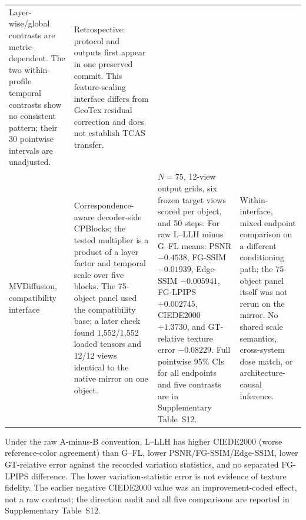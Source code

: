 \documentclass[times,twocolumn,final]{elsarticle}
\providecommand{\DIFadd}[1]{{\protect\color{blue} \sf #1}} %
\providecommand{\DIFaddbegin}{} %
\providecommand{\DIFaddend}{} %
\providecommand{\DIFaddFL}[1]{\DIFadd{#1}} %
\providecommand{\DIFaddbeginFL}{\DIFaddbegin} %
\providecommand{\DIFaddendFL}{\DIFaddend} %
\renewcommand{\DIFaddbeginFL}{}
\renewcommand{\DIFaddendFL}{}
\renewcommand{\DIFaddFL}[1]{#1}
\begin{document}
\begin{table}[t]
\begin{tabular}{p{2.4cm}p{4.0cm}p{4.2cm}p{4.5cm}}
\DIFaddFL{Layer-wise/global contrasts are metric-dependent. The two within-profile temporal contrasts show no consistent pattern; their 30 pointwise intervals are unadjusted. }&
\DIFaddFL{Retrospective: protocol and outputs first appear in one preserved commit. This feature-scaling interface differs from GeoTex residual correction and does not establish TCAS transfer. }\\
\DIFaddFL{MVDiffusion, compatibility interface }&
\DIFaddFL{Correspondence-aware decoder-side CPBlocks; the tested multiplier is a product of a layer factor and temporal scale over five blocks. The 75-object panel used the compatibility base; a later check found 1,552/1,552 loaded tensors and 12/12 views identical to the native mirror on one object. }&
\DIFaddFL{$N=75$}\DIFaddendFL , \DIFaddbeginFL \DIFaddFL{12-view output grids, six frozen target views scored per object, }\DIFaddendFL and \DIFaddbeginFL \DIFaddFL{50 steps. For raw L--LLH minus G--FL means: PSNR $-0.4538$, FG-SSIM $-0.01939$, Edge-SSIM $-0.005941$, FG-LPIPS $+0.002745$, CIEDE2000 $+1.3730$, and GT-relative texture error $-0.08229$. Full pointwise 95\% CIs for all endpoints and five contrasts are in Supplementary Table~S12. }&
\DIFaddFL{Within-interface, mixed endpoint comparison on a different conditioning path; the 75-object panel itself was not rerun on the mirror. No shared scale semantics, cross-system dose match, or architecture-causal inference. }\\
\bottomrule
\end{tabular}
\end{table}

\DIFadd{Under the raw A-minus-B convention, L--LLH has higher CIEDE2000 (worse reference-color agreement) than G--FL, lower PSNR/FG-SSIM/Edge-SSIM, lower GT-relative error against the recorded variation statistics, and no separated FG-LPIPS difference. The lower variation-statistic error is not evidence of texture fidelity. The earlier negative CIEDE2000 value was an improvement-coded effect, not a raw contrast; the direction audit and all five comparisons are reported in Supplementary Table~S12.
}
\end{document}
